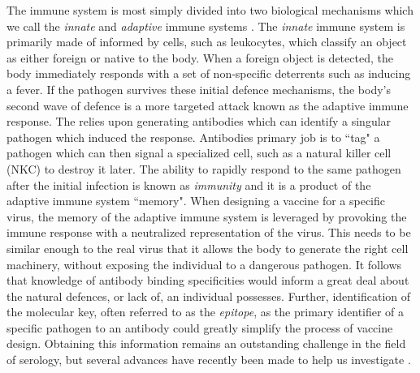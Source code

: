 \documentclass{article}
\begin{document}
The immune system is most simply divided into two biological mechanisms which we call the \textit{innate} and \textit{adaptive} immune systems \cite{Jain2017}.
The \textit{innate} immune system is primarily made of informed by cells, such as leukocytes, which classify an object as either foreign or native to the body.
When a foreign object is detected, the body immediately responds with a set of non-specific deterrents such as inducing a fever.
If the pathogen survives these initial defence mechanisms, the body's second wave of defence is a more targeted attack known as the adaptive immune response.
The relies upon generating antibodies which can identify a singular pathogen which induced the response. 
Antibodies primary job is to ``tag" a pathogen which can then signal a specialized cell, such as a natural killer cell (NKC) to destroy it later. 
The ability to rapidly respond to the same pathogen after the initial infection is known as \textit{immunity} and it is a product of the adaptive immune system ``memory".
When designing a vaccine for a specific virus, the memory of the adaptive immune system is leveraged by provoking the immune response with a 
neutralized representation of the virus.
This needs to be similar enough to the real virus that it allows the body to generate the right cell machinery, without exposing the individual to a dangerous pathogen.
It follows that knowledge of antibody binding specificities would inform a great deal about the natural defences, or lack of, an individual possesses.
Further, identification of the molecular key, often referred to as the \textit{epitope}, as the primary identifier of a specific pathogen to an antibody could greatly simplify the process of vaccine design.
Obtaining this information remains an outstanding challenge in the field of serology, but several advances have recently been made to help us investigate \cite{Doepker2020}.
\end{document}
